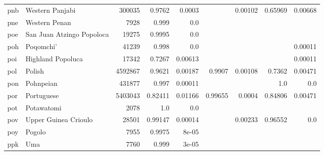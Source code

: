 \documentclass[11pt]{article}
\begin{document}
\begin{table*}[h]
{\begin{tabular}{llrrrrrrr}
pnb         & Western Panjabi         & 300035         & 0.9762         & 0.0003         &          & 0.00102         & 0.65969         & 0.00668         \\

pne         & Western Penan         & 7928         & 0.999         & 0.0         &          &          &          &          \\

poe         & San Juan Atzingo Popoloca         & 19275         & 0.9995         & 0.0         &          &          &          &          \\

poh         & Poqomchi'         & 41239         & 0.998         & 0.0         &          &          &          & 0.00011         \\

poi         & Highland Popoluca         & 17342         & 0.7267         & 0.00613         &          &          &          & 0.00011         \\

pol         & Polish         & 4592867         & 0.9621         & 0.00187         & 0.9907         & 0.00108         & 0.7362         & 0.00471         \\

pon         & Pohnpeian         & 431877         & 0.997         & 0.00011         &          &          & 1.0         & 0.0         \\

por         & Portuguese         & 5403043         & 0.82411         & 0.01166         & 0.99655         & 0.0004         & 0.84806         & 0.00471         \\

pot         & Potawatomi         & 2078         & 1.0         & 0.0         &          &          &          &          \\

pov         & Upper Guinea Crioulo         & 28501         & 0.99147         & 0.00014         &          & 0.00233         & 0.96552         & 0.0         \\

poy         & Pogolo         & 7955         & 0.9975         & 8e-05         &          &          &          &          \\

ppk         & Uma         & 7760         & 0.999         & 3e-05         &          &          &          &          \\


\end{tabular}}
\end{table*}
\end{document}
